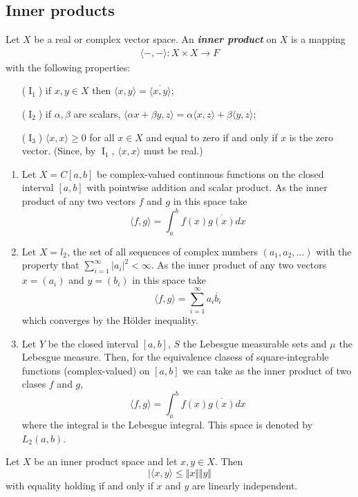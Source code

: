 \documentclass{article}
\theoremstyle{definition}
\numberwithin{equation}{section}
\begin{document}
	\subsection{Inner products}
	Let $X$ be a real or complex vector space.
	An \textbf{\textit{inner product}} on $X$ is a mapping
	\begin{align*}
		\langle-,-\rangle:X\times X\to F
	\end{align*}
	with the following properties:
	\begin{enumerate}
		\item[($\operatorname{I}_1$)] if $x,y\in X$ then $\langle x,y\rangle=\overline{\langle x,y\rangle}$;
		\item[($\operatorname{I}_2$)] if $\alpha,\beta$ are scalars, $\langle\alpha x+\beta y,z\rangle =\alpha\langle x,z\rangle+\beta\langle y,z\rangle$;
		\item[($\operatorname{I}_3$)] $\langle x,x\rangle\geq0$ for all $x\in X$ and equal to zero if and only if $x$ is the zero vector. (Since, by $\operatorname{I}_1$, $\langle x,x\rangle$ must be real.)
	\end{enumerate}
	\begin{examples}\leavevmode
		\begin{enumerate}
			\item Let $X=C[a,b]$ be complex-valued continuous functions on the closed interval $[a,b]$ with pointwise addition and scalar product. As the inner product of any two vectors $f$ and $g$ in this space take
			\[\langle f,g\rangle=\int_a^bf(x)\overline{g(x)}dx\]
			\item Let $X=l_2$, the set of all sequences of complex numbers $(a_1,a_2,\ldots)$ with the property that $\sum_{i=1}^\infty|a_i|^2<\infty$. As the inner product of any two vectors $x=(a_i)$ and $y=(b_i)$ in this space take
			\[\langle f,g\rangle=\sum_{i=1}^\infty a_i\overline{b}_i\]
			which converges by the Hölder inequality.
			
			\item Let $Y$ be the closed interval $[a,b]$, $S$ the Lebesgue measurable sets and $\mu$ the Lebesgue measure. Then, for the equivalence clasess of square-integrable functions (complex-valued) on $[a,b]$ we can take as the inner product of two clases $f$ and $g$,
			\[\langle f,g\rangle=\int_a^bf(x)\overline{g(x)}dx\]
			where the integral is the Lebesgue integral. This space is denoted by $L_2(a,b)$.
		\end{enumerate}
	\end{examples}
	\begin{thm}
		Let $X$ be an inner product space and let $x,y\in X$. Then
		\[|\langle x,y\rangle\leq\Vert x\Vert\Vert y\Vert\]
		with equality holding if and only if $x$ and $y$ are linearly independent.
	\end{thm}
\end{document}
